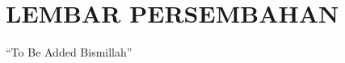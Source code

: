 \chapter*{\uppercase{LEMBAR PERSEMBAHAN}}
\vspace{1cm}

\begin{center}
    ``To Be Added Bismillah''
\end{center}

\newpage